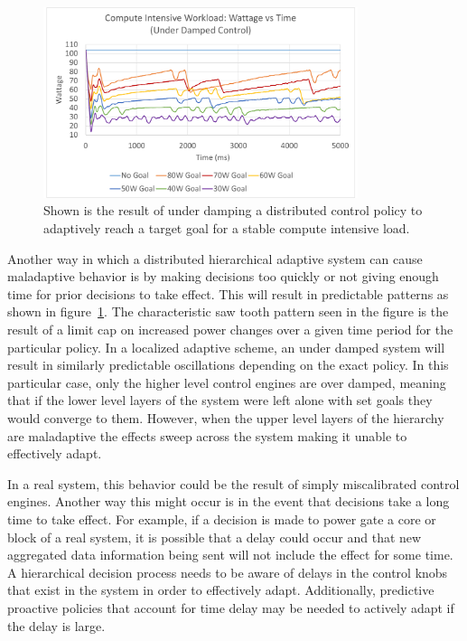             \begin{figure}[htb!]
                \centering
                \includegraphics[width=0.82\textwidth]{Fig/compute_no_delay_graph.pdf}
                \caption[Compute Intensive Workload Using an Adaptive Goal Adjustment Policy with Under Damped Control (Watts vs Time)]{Shown is the result of under damping a distributed control policy to adaptively reach a target goal for a stable compute intensive load.}
                \label{fig:compute_no_delay_graph}
            \end{figure}

            Another way in which a distributed hierarchical adaptive system can cause maladaptive behavior is by making decisions too quickly or not giving enough time for prior decisions to take effect. This will result in predictable patterns as shown in figure~\ref{fig:compute_no_delay_graph}. The characteristic saw tooth pattern seen in the figure is the result of a limit cap on increased power changes over a given time period for the particular policy. In a localized adaptive scheme, an under damped system will result in similarly predictable oscillations depending on the exact policy. In this particular case, only the higher level control engines are over damped, meaning that if the lower level layers of the system were left alone with set goals they would converge to them. However, when the upper level layers of the hierarchy are maladaptive the effects sweep across the system making it unable to effectively adapt.

            In a real system, this behavior could be the result of simply miscalibrated control engines. Another way this might occur is in the event that decisions take a long time to take effect. For example, if a decision is made to power gate a core or block of a real system, it is possible that a delay could occur and that new aggregated data information being sent will not include the effect for some time. A hierarchical decision process needs to be aware of delays in the control knobs that exist in the system in order to effectively adapt. Additionally, predictive proactive policies that account for time delay may be needed to actively adapt if the delay is large. 

